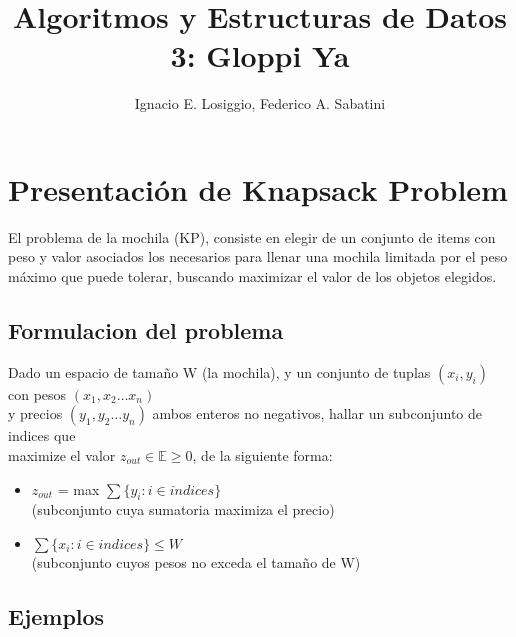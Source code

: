 \documentclass[fleqn, 11pt]{article}
\title{Algoritmos y Estructuras de Datos 3: Gloppi Ya}
\author{Ignacio E. Losiggio, Federico A. Sabatini}
\begin{document}
\maketitle

\tableofcontents

\section{Presentación de Knapsack Problem}

El problema de la mochila (KP), consiste en elegir de un conjunto de items con
peso y valor asociados los necesarios para llenar una mochila limitada por el
peso máximo que puede tolerar, buscando maximizar el valor de los objetos
elegidos.

\subsection{Formulacion del problema}

Dado un espacio de tamaño W (la mochila), y un conjunto de tuplas $(x_i, y_i)$ con pesos $(x_1, x_2 \dots x_n)$ \\
y precios $(y_1, y_2 \dots y_n)$ ambos enteros no negativos, hallar un subconjunto de indices que \\
maximize el valor $z_{out} \in\mathbb{E} \geq 0$, de la siguiente forma:

\begin{itemize}
	\item $z_{out} $ = max $\sum \{ y_i : i \in indices \} $ \\ (subconjunto cuya sumatoria maximiza el precio)
	\item $\sum \{ x_i : i \in indices \} \le W $ \\ (subconjunto cuyos pesos no exceda el tamaño de W)
\end{itemize}

\subsection{Ejemplos}
\end{document}

